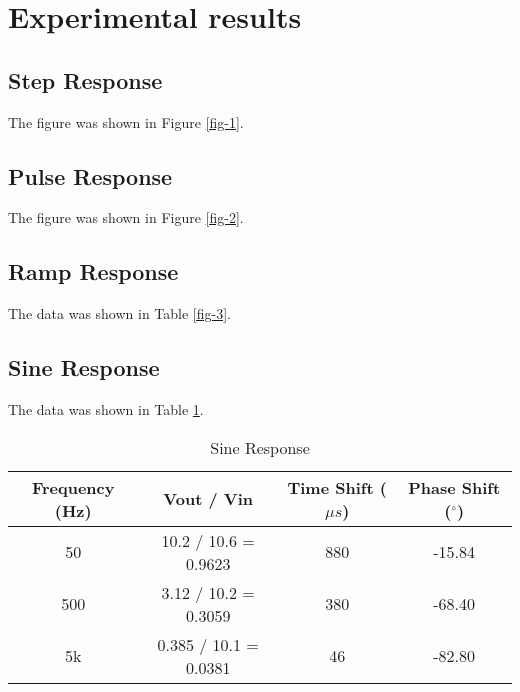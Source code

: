 \documentclass{article}
\begin{document}
\section{Experimental results}

\subsection{Step Response}
The figure was shown in Figure \ref{fig-1}.


\subsection{Pulse Response}
The figure was shown in Figure \ref{fig-2}.


\subsection{Ramp Response}
The data was shown in Table \ref{fig-3}.


\subsection{Sine Response}
The data was shown in Table \ref{tab-4}.

\begin{table}[htbp]
	\centering
	\begin{tabular}{|c|c|c|c|}
		\hline
		Frequency (Hz) & Vout / Vin & Time Shift ($\mu s$) & Phase Shift ($^\circ$) \\
		\hline
		50 & 10.2 / 10.6 = 0.9623 & 880 & -15.84 \\
		\hline
		500 & 3.12 / 10.2  = 0.3059 & 380 & -68.40 \\
		\hline
		5k & 0.385 / 10.1 = 0.0381 & 46 & -82.80\\
		\hline
	\end{tabular}
	\caption{Sine Response}
	\label{tab-4}
\end{table}
\end{document}
